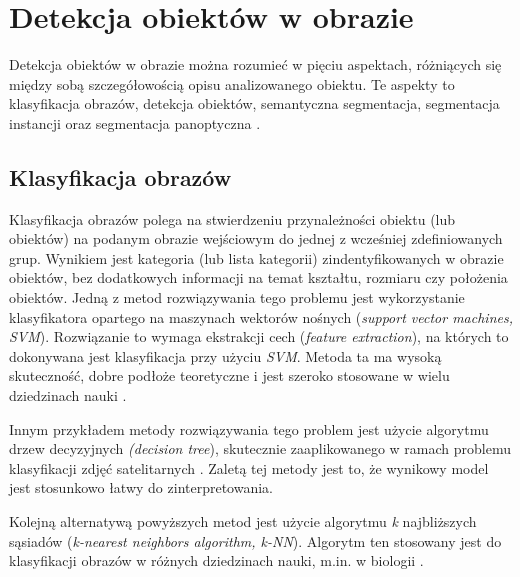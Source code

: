 \section{Detekcja obiektów w obrazie}
\label{sec:typy_detekcji}

Detekcja obiektów w obrazie można rozumieć w pięciu aspektach, różniących się między sobą szczegółowością opisu analizowanego obiektu. Te aspekty to klasyfikacja obrazów, detekcja obiektów, semantyczna segmentacja, segmentacja instancji \cite{survey-of-object-classification} oraz segmentacja panoptyczna \cite{panoptic-segmentation}.

\subsection*{Klasyfikacja obrazów}
Klasyfikacja obrazów polega na stwierdzeniu przynależności obiektu (lub obiektów) na podanym obrazie wejściowym do jednej z wcześniej zdefiniowanych grup. Wynikiem jest kategoria (lub lista kategorii) zindentyfikowanych w obrazie obiektów, bez dodatkowych informacji na temat kształtu, rozmiaru czy położenia obiektów. Jedną z metod rozwiązywania tego problemu jest wykorzystanie klasyfikatora opartego na maszynach wektorów nośnych (\textit{support vector machines, SVM}). Rozwiązanie to wymaga ekstrakcji cech (\textit{feature extraction}), na których to dokonywana jest klasyfikacja przy użyciu \textit{SVM}. Metoda ta ma wysoką skuteczność, dobre podłoże teoretyczne i jest szeroko stosowane w wielu dziedzinach nauki \cite{analysis-image-classification}.

Innym przykładem metody rozwiązywania tego problem jest użycie algorytmu drzew decyzyjnych \textit{(decision tree}), skutecznie zaaplikowanego w ramach problemu klasyfikacji zdjęć satelitarnych \cite{decision-image-classifier}. Zaletą tej metody jest to, że wynikowy model jest stosunkowo łatwy do zinterpretowania.

Kolejną alternatywą powyższych metod jest użycie algorytmu \textit{k} najbliższych sąsiadów (\textit{k-nearest neighbors algorithm, k-NN}). Algorytm ten stosowany jest do klasyfikacji obrazów w różnych dziedzinach nauki, m.in. w biologii \cite{analysis-image-classification}.

